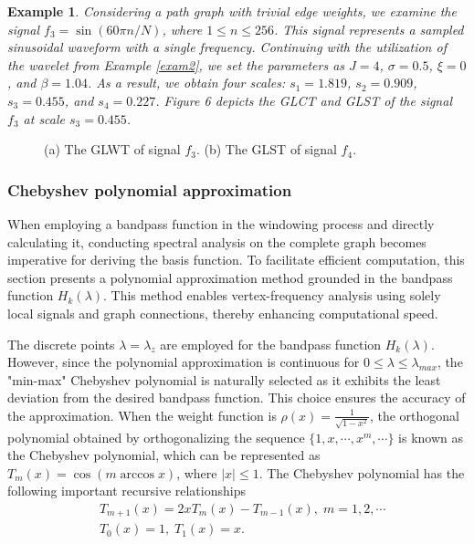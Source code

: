 \documentclass[lettersize,journal]{IEEEtran}
\newtheorem{example}{Example}
\begin{document}
\begin{example} \label{exam3}
	Considering a path graph with trivial edge weights, we examine the signal $f_3=\sin (60 \pi n / N)$, where $1 \leq n \leq 256$. This signal represents a sampled sinusoidal waveform with a single frequency. 
	Continuing with the utilization of the wavelet from Example \ref{exam2}, we set the parameters as $J=4$, $\sigma=0.5$, $\xi=0$, and $\beta=1.04$. As a result, we obtain four scales: $s_1=1.819$, $s_2=0.909$, $s_3=0.455$, and $s_4=0.227$.
	Figure 6 depicts the GLCT and GLST of the signal $f_3$ at scale $s_3=0.455$.
\end{example}


\begin{figure}
	\centering
	\caption{(a) The GLWT of signal $f_3$. (b) The GLST of signal $f_4$. }\label{fig6}
\end{figure}

\subsubsection{Chebyshev polynomial approximation}
\label{sec3.2.3}
When employing a bandpass function in the windowing process and directly calculating it, conducting spectral analysis on the complete graph becomes imperative for deriving the basis function. To facilitate efficient computation, this section presents a polynomial approximation method grounded in the bandpass function $H_k(\lambda)$. This method enables vertex-frequency analysis using solely local signals and graph connections, thereby enhancing computational speed. 

The discrete points $\lambda=\lambda_z$ are employed for the bandpass function $H_k(\lambda)$. However, since the polynomial approximation is continuous for $0 \leq \lambda \leq \lambda_{max}$, the "min-max" Chebyshev polynomial is naturally selected as it exhibits the least deviation from the desired bandpass function. This choice ensures the accuracy of the approximation.
When the weight function is $\rho(x)=\frac{1}{\sqrt{1-x^2}}$, the orthogonal polynomial obtained by orthogonalizing the sequence $\{1,x,\cdots,x^m,\cdots \}$ is known as the Chebyshev polynomial, which can be represented as $T_m(x)=\cos (m \arccos x)$, where $|x| \leq 1$. 
The Chebyshev polynomial has the following important recursive relationships
\begin{align}
	&T_{m+1}(x)=2xT_m(x)-T_{m-1}(x), \; m=1,2,\cdots \nonumber \\
	&T_0(x)=1, \; T_1(x)=x.
\end{align}
\end{document}
